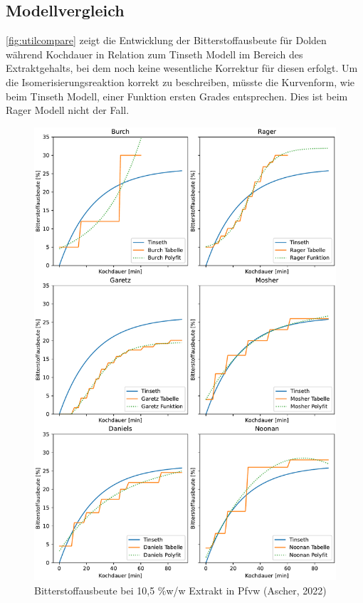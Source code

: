 \documentclass[a4paper,parskip=half]{scrartcl}
\begin{document}
\subsection*{Modellvergleich}

\autoref{fig:utilcompare} zeigt die Entwicklung der Bitterstoffausbeute für Dolden während Kochdauer in Relation zum Tinseth Modell im Bereich des Extraktgehalts, bei dem noch keine wesentliche Korrektur für diesen erfolgt. Um die Isomerisierungsreaktion korrekt zu beschreiben, müsste die Kurvenform, wie beim Tinseth Modell, einer Funktion ersten Grades entsprechen. Dies ist beim Rager Modell nicht der Fall.

\begin{figure}[h]
\centering
\includegraphics[width=14cm]{graph_utilization.pdf}
\caption{Bitterstoffausbeute bei 10,5 \%w/w Extrakt in Pfvw (Ascher, 2022)}
\label{fig:utilcompare}
\end{figure}
\end{document}

